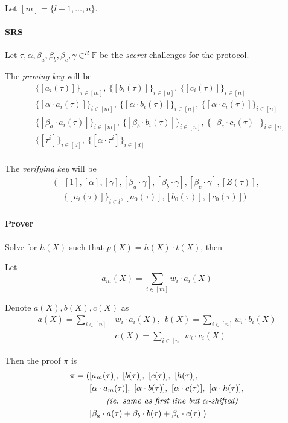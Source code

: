 \documentclass{article}
\begin{document}
\vspace{0.3cm}
Let $[m]= \{ l+1, \ldots, n \}$.

\paragraph{SRS}
Let $\tau, \alpha, \beta_a, \beta_b, \beta_c, \gamma \in^R \mathbb{F}$ be the \emph{secret} challenges for the protocol.

The \emph{proving key} will be
\begin{align*}
    &\{ [a_i(\tau)] \}_{i \in [m]},~ \{ [b_i(\tau)] \}_{i \in [n]},~ \{ [c_i(\tau)] \}_{i \in [n]}\\
    &\{ [\alpha \cdot a_i(\tau)] \}_{i \in [m]},~ \{ [\alpha \cdot b_i(\tau)] \}_{i \in [n]},~ \{ [\alpha \cdot c_i(\tau)] \}_{i \in [n]}\\
    &\{ [\beta_a \cdot a_i(\tau)] \}_{i \in [m]},~ \{ [\beta_b \cdot b_i(\tau)] \}_{i \in [n]},~ \{ [\beta_c \cdot c_i(\tau)] \}_{i \in [n]}\\
    &\{ [\tau^i] \}_{i \in [d]},~ \{ [\alpha \cdot \tau^i] \}_{i \in [d]}\\
\end{align*}

The \emph{verifying key} will be
\begin{align*}
    (&[1], [\alpha], [\gamma], [\beta_a \cdot \gamma], [\beta_b \cdot \gamma], [\beta_c \cdot \gamma], [Z(\tau)],\\
     &\{[a_i(\tau)]\}_{i \in l}, [a_0(\tau)], [b_0(\tau)], [c_0(\tau)])
\end{align*}

\paragraph{Prover}
Solve for $h(X)$ such that $p(X)=h(X) \cdot t(X)$, then

Let
$$a_m(X) = \sum_{i \in [m]} w_i \cdot a_i(X)$$

Denote $a(X), b(X), c(X)$ as
\begin{align*}
    a(X) = \sum_{i \in [n]} &w_i \cdot a_i(X), ~~ b(X) = \sum_{i \in [n]} w_i \cdot b_i(X)\\
				&c(X) = \sum_{i \in [n]} w_i \cdot c_i(X)
\end{align*}

Then the proof $\pi$ is
\begin{align*}
    \pi = (&[a_m(\tau)],~ [b(\tau)],~ [c(\tau)],~ [h(\tau)],~\\
	   &[\alpha \cdot a_m(\tau)],~ [\alpha \cdot b(\tau)],~ [\alpha \cdot c(\tau)],~[\alpha \cdot h(\tau)],\\
	   &\hspace*{2em}\text{\emph{(ie. same as first line but $\alpha$-shifted)}}\\
	   &[ \beta_a \cdot a(\tau) + \beta_b \cdot b(\tau) + \beta_c \cdot c(\tau)]
    )
\end{align*}
\end{document}

